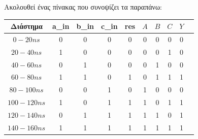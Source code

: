 \documentclass[]{article}
\begin{document}
Ακολουθεί ένας πίνακας που συνοψίζει τα παραπάνω:
\begin{center}
	\begin{tabular}{|c|c|c|c|c|c|c|c|c|c}
		\hline Διάστημα  & a\_in & b\_in & c\_in & res & $A$ & $B$ & $C$ & $Y$ \\
		\hline $0-20 ns$ & 0     & 0     & 0     & 0   & 0   & 0   & 0   & 0   \\
		$20-40 ns$       & 1     & 0     & 0     & 0   & 0   & 0   & 1   & 0   \\
		$40-60 ns$       & 0     & 1     & 0     & 0   & 0   & 1   & 0   & 0   \\
		$60-80 ns$       & 1     & 1     & 0     & 1   & 0   & 1   & 1   & 1   \\
		$80-100 ns$      & 0     & 0     & 1     & 0   & 1   & 0   & 0   & 0   \\
		$100-120 ns$     & 1     & 0     & 1     & 1   & 1   & 0   & 1   & 1   \\
		$120-140 ns$     & 0     & 1     & 1     & 1   & 1   & 1   & 0   & 1   \\
		$140-160 ns$     & 1     & 1     & 1     & 1   & 1   & 1   & 1   & 1   \\
		\hline
	\end{tabular}
\end{center}
\end{document}

